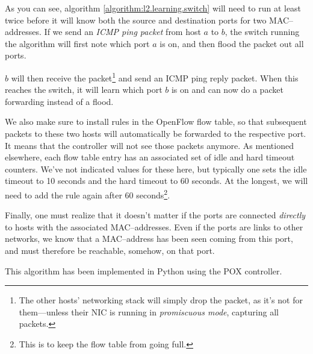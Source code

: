 As you can see, algorithm \ref{algorithm:l2.learning.switch} will need to
run at least twice before it will know both the source and destination ports
for two MAC--addresses.  If we send an \textit{\acs{ICMP} ping packet} from
host $a$ to $b$, the switch running the algorithm will first note which port
$a$ is on, and then flood the packet out all ports.

$b$ will then receive the packet\footnote{The other hosts' networking stack
will simply drop the packet, as it's not for them---unless their \acs{NIC} is
running in \textit{promiscuous mode}, capturing all packets.} and send an \acs{ICMP}
ping reply packet.  When this reaches the switch, it will learn which port
$b$ is on and can now do a packet forwarding instead of a flood.

We also make sure to install rules in the OpenFlow flow table, so that
subsequent packets to these two hosts will automatically be forwarded to the
respective port.  It means that the controller will not see those packets
anymore.  As mentioned elsewhere, each flow table entry has an associated
set of idle and hard timeout counters.  We've not indicated values for these
here, but typically one sets the idle timeout to 10 seconds and the hard
timeout to 60 seconds.  At the longest, we will need to add the rule again
after 60 seconds\footnote{This is to keep the flow table from going full.}.

Finally, one must realize that it doesn't matter if the ports are connected
\textit{directly} to hosts with the associated MAC--addresses.  Even if the
ports are links to other networks, we know that a MAC--address has been seen
coming from this port, and must therefore be reachable, somehow, on that
port.

This algorithm has been implemented in Python using the POX controller.
